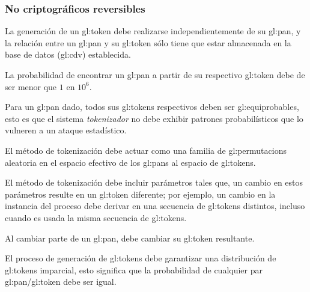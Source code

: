 %
%

\subsubsection{No criptográficos reversibles}

{
  La generación de un \gls{gl:token} debe realizarse independientemente de
  su \gls{gl:pan}, y la relación entre un \gls{gl:pan} y su \gls{gl:token}
  sólo tiene que estar almacenada en la base de datos (\gls{gl:cdv})
  establecida.
}

{
  La probabilidad de encontrar un \gls{gl:pan} a partir de su respectivo
  \gls{gl:token} debe de ser menor que $1$ en $10^6$.

  {
    Para un \gls{gl:pan} dado, todos sus \glspl{gl:token} respectivos
    deben ser \glspl{gl:equiprobable}, esto es que el sistema
    \textit{tokenizador} no debe exhibir patrones probabilísticos que
    lo vulneren a un ataque estadístico.
  }

  {
    El método de tokenización debe actuar como una familia de
    \glspl{gl:permutacion} aleatoria en el espacio efectivo de los
    \glspl{gl:pan} al espacio de \glspl{gl:token}.
  }

  {
    El método de tokenización debe incluir parámetros tales que, un
    cambio en estos parámetros resulte en un \gls{gl:token} diferente;
    por ejemplo, un cambio en la instancia del proceso debe derivar en
    una secuencia de \glspl{gl:token} distintos, incluso cuando es usada
    la misma secuencia de \glspl{gl:token}.
  }

  {
    Al cambiar parte de un \gls{gl:pan}, debe cambiar su \gls{gl:token}
    resultante.
  }
}

{
  El proceso de generación de \glspl{gl:token} debe garantizar una
  distribución de \glspl{gl:token} imparcial, esto significa que la
  probabilidad de cualquier par \gls{gl:pan}/\gls{gl:token} debe ser igual.
}

